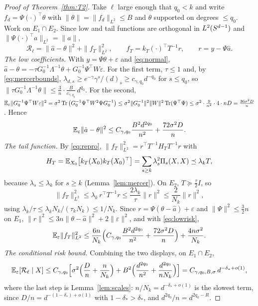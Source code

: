 \begin{proof}[Proof of Theorem~\ref{thm:T2}]
Take $\ell$ large enough that $q_0<k$ and write $f_d=\Psi(\cdot)^\top\theta$ with $\|\theta\|=\|f_d\|_{L^2}\le B$
and $\theta$ supported on degrees $\le q_0$. Work on $E_1\cap E_2$. Since low and tail functions are
orthogonal in $L^2(S^{d-1})$ and $\|\Psi(\cdot)^\top a\|_{L^2}=\|a\|$,
\[
\mathcal R_\ell=\|\hat a-\theta\|^2+\|f_T\|_{L^2}^2,\qquad f_T=k_T(\cdot)^\top T^{-1}r,\qquad r=y-\Psi\hat a .
\]
\emph{The low coefficients.} With $y=\Psi\theta+\varepsilon$ and \eqref{eq:normal},
$\hat a-\theta=-\tau G_0^{-1}\Lambda^{-1}\theta+G_0^{-1}\Psi^\top W\varepsilon$. For the first term, $\tau\le1$ and, by
\eqref{eq:mercerbounds}, $\lambda_{d,s}\ge e^{-\gamma}\gamma^{s}/(d)_s\ge c_{\gamma,q_0}d^{-q_0}$ for $s\le q_0$, so
$\|\tau G_0^{-1}\Lambda^{-1}\theta\|\le\frac3n\cdot\frac{B}{c_{\gamma,q_0}}\,d^{q_0}$. For the second,
$\mathbb{E}_\varepsilon\|G_0^{-1}\Psi^\top W\varepsilon\|^2=\sigma^2\operatorname{Tr}\big(G_0^{-1}\Psi^\top W^2\Psi G_0^{-1}\big)
\le\sigma^2\|G_0^{-1}\|^2\|W\|^2\operatorname{Tr}(\Psi^\top\Psi)\le\sigma^2\cdot\frac9{n^2}\cdot4\cdot nD=\frac{36\sigma^2D}n$.
Hence
\begin{equation}
\mathbb{E}_\varepsilon\|\hat a-\theta\|^2\le C_{\gamma,q_0}\frac{B^2d^{2q_0}}{n^2}+\frac{72\sigma^2D}{n}.
\label{eq:lowrisk}
\end{equation}
\emph{The tail function.} By \eqref{eq:repro}, $\|f_T\|_{L^2}^2=r^\top T^{-1}H_TT^{-1}r$ with
\[
H_T=\mathbb{E}_{X_0}\big[k_T(X_0)k_T(X_0)^\top\big]=\sum_{s\ge k}\lambda_s^2\Pi_s(X,X)\preceq\lambda_kT,
\]
because $\lambda_s\le\lambda_k$ for $s\ge k$ (Lemma~\ref{lem:mercer}). On $E_2$, $T\succeq\tfrac\tau2I$, so
\[
\|f_T\|_{L^2}^2\le\lambda_k\,r^\top T^{-1}r\le\frac{2\lambda_k}{\tau}\|r\|^2\le\frac2{N_k}\|r\|^2,
\]
using $\lambda_k/\tau\le\lambda_kN_k/(\tau_kN_k)\le1/N_k$. Since $r=\Psi(\theta-\hat a)+\varepsilon$ and $\|\Psi\|^2\le\tfrac32n$
on $E_1$, $\|r\|^2\le3n\|\theta-\hat a\|^2+2\|\varepsilon\|^2$, and with \eqref{eq:lowrisk},
\[
\mathbb{E}_\varepsilon\|f_T\|_{L^2}^2\le\frac{6n}{N_k}\Big(C_{\gamma,q_0}\frac{B^2d^{2q_0}}{n^2}+\frac{72\sigma^2D}n\Big)+\frac{4n\sigma^2}{N_k}.
\]
\emph{The conditional risk bound.} Combining the two displays, on $E_1\cap E_2$,
\begin{equation}
\mathbb{E}_\varepsilon[\mathcal R_\ell\mid X]\le C_{\gamma,q_0}\Big[\sigma^2\Big(\frac Dn+\frac n{N_k}\Big)+B^2\Big(\frac{d^{2q_0}}{n^2}+\frac{d^{2q_0}}{nN_k}\Big)\Big]
=C_{\gamma,q_0,B,\sigma}\,d^{-\delta_*+o(1)},
\label{eq:riskbound}
\end{equation}
where the last step is Lemma~\ref{lem:scales}: $n/N_k=d^{-\delta_*+o(1)}$ is the slowest term, since
$D/n=d^{-(1-\delta_*)+o(1)}$ with $1-\delta_*>\delta_*$, and $d^{2q_0}/n=d^{2q_0-R}$.


\end{proof}

